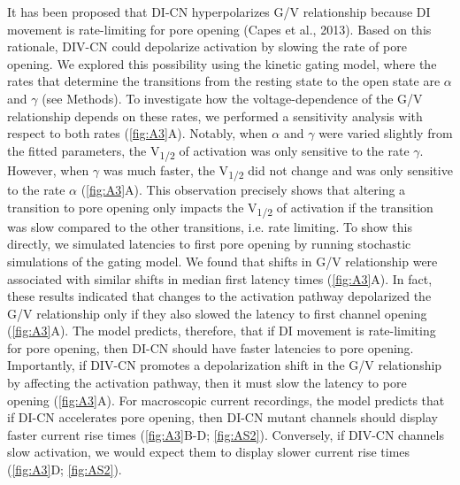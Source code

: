 It has been proposed that DI-CN hyperpolarizes G/V relationship because DI movement is rate-limiting for pore opening (Capes et al., 2013). Based on this rationale, DIV-CN could depolarize activation by slowing the rate of pore opening. We explored this possibility using the kinetic gating model, where the rates that determine the transitions from the resting state to the open state are $\alpha$ and $\gamma$ (see Methods). To investigate how the voltage-dependence of the G/V relationship depends on these rates, we performed a sensitivity analysis with respect to both rates (\autoref{fig:A3}A). Notably, when $\alpha$ and $\gamma$ were varied slightly from the fitted parameters, the V\textsubscript{1/2} of activation was only sensitive to the rate $\gamma$. However, when $\gamma$ was much faster, the V\textsubscript{1/2} did not change and was only sensitive to the rate $\alpha$ (\autoref{fig:A3}A). This observation precisely shows that altering a transition to pore opening only impacts the V\textsubscript{1/2} of activation if the transition was slow compared to the other transitions, i.e. rate limiting. To show this directly, we simulated latencies to first pore opening by running stochastic simulations of the gating model. We found that shifts in G/V relationship were associated with similar shifts in median first latency times (\autoref{fig:A3}A). In fact, these results indicated that changes to the activation pathway depolarized the G/V relationship only if they also slowed the latency to first channel opening (\autoref{fig:A3}A). The model predicts, therefore, that if DI movement is rate-limiting for pore opening, then DI-CN should have faster latencies to pore opening. Importantly, if DIV-CN promotes a depolarization shift in the G/V relationship by affecting the activation pathway, then it must slow the latency to pore opening (\autoref{fig:A3}A). For macroscopic current recordings, the model predicts that if DI-CN accelerates pore opening, then DI-CN mutant channels should display faster current rise times (\autoref{fig:A3}B-D; \autoref{fig:AS2}). Conversely, if DIV-CN channels slow activation, we would expect them to display slower current rise times (\autoref{fig:A3}D; \autoref{fig:AS2}).

